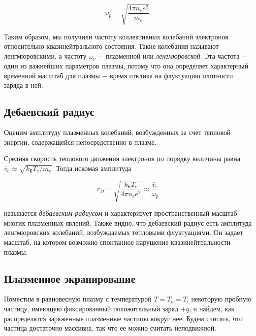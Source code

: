 \documentclass[a4paper,12pt]{article} %
\begin{document}
\begin{equation}\label{ linkname }
\omega_{p} = \sqrt{\frac{4\pi n_{e}e^2}{m_{e}}}.
\end{equation}

\hfill \break Таким образом, мы получили частоту коллективных колебаний электронов относительно квазинейтрального состояния. Такие колебания называют ленгмюровскими, а частоту $\omega_{p}$ $-$ плазменной или \textit{ленгмюровской}. Эта частота $-$ один из важнейших параметров плазмы, потому что она определяет характерный временной масштаб для плазмы $-$ время отклика на флуктуацию плотности заряда в ней.

\subsection{Дебаевский радиус}

\hfill \break Оценим амплитуду плазменных колебаний, возбужденных за счет тепловой энергии, содержащейся непосредственно в плазме. 

\hfill \break Средняя скорость теплового движения электронов по порядку величины равна $\bar v_{e} \approx \sqrt{k_\text{Б}T_{e}/m_{e}}$. Тогда искомая амплитуда

\begin{equation}\label{ linkname }
r_{D} = \sqrt{\frac{k_\text{Б}T_{e}}{4\pi n_{e}e^2}} \approx \frac{\bar v_{e}}{\omega_{p}}
\end{equation}

\hfill \break называется \textit{дебаевским радиусом} и характеризует пространственный масштаб многих плазменных явлений. Также видно, что дебаевский радиус есть амплитуда ленгмюровских колебаний, возбуждаемых тепловыми флуктуациями. Он задает масштаб, на котором возможно спонтанное нарушение квазинейтральности плазмы.

\subsection{Плазменное экранирование}

\hfill \break Поместим в равновесную плазму с температурой $T = T_{e} = T_{i}$ некоторую пробную частицу, имеющую фиксированный положительный заряд $+q$, и найдем, как распределятся заряженные плазменные частицы вокруг нее. Будем считать, что частица достаточно массивна, так что ее можно считать неподвижной.
\end{document}

